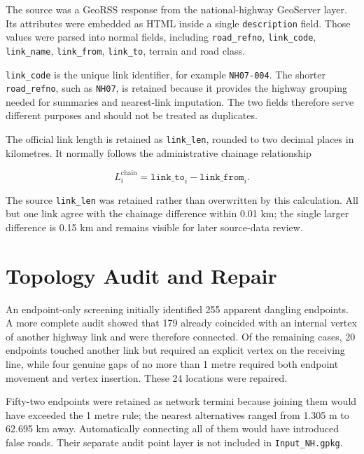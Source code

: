 \documentclass[11pt,a4paper]{article}
\begin{document}
The source was a GeoRSS response from the national-highway GeoServer layer. Its
attributes were embedded as HTML inside a single \texttt{description} field.
Those values were parsed into normal fields, including
\texttt{road\_refno}, \texttt{link\_code}, \texttt{link\_name},
\texttt{link\_from}, \texttt{link\_to}, terrain and road class.

\texttt{link\_code} is the unique link identifier, for example
\texttt{NH07-004}. The shorter \texttt{road\_refno}, such as \texttt{NH07}, is
retained because it provides the highway grouping needed for summaries and
nearest-link imputation. The two fields therefore serve different purposes and
should not be treated as duplicates.

The official link length is retained as \texttt{link\_len}, rounded to two
decimal places in kilometres. It normally follows the administrative chainage
relationship

\begin{equation}
L_i^{\mathrm{chain}} = \texttt{link\_to}_i -
\texttt{link\_from}_i.
\label{eq:linklength}
\end{equation}

The source \texttt{link\_len} was retained rather than overwritten by this
calculation. All but one link agree with the chainage difference within
0.01 km; the single larger difference is 0.15 km and remains visible for later
source-data review.

\section{Topology Audit and Repair}

An endpoint-only screening initially identified 255 apparent dangling
endpoints. A more complete audit showed that 179 already coincided with an
internal vertex of another highway link and were therefore connected. Of the
remaining cases, 20 endpoints touched another link but required an explicit
vertex on the receiving line, while four genuine gaps of no more than 1 metre
required both endpoint movement and vertex insertion. These 24 locations were
repaired.

Fifty-two endpoints were retained as network termini because joining them would
have exceeded the 1 metre rule; the nearest alternatives ranged from 1.305 m to
62.695 km away. Automatically connecting all of them would have introduced
false roads. Their separate audit point layer is not included in
\texttt{Input\_NH.gpkg}.
\end{document}
